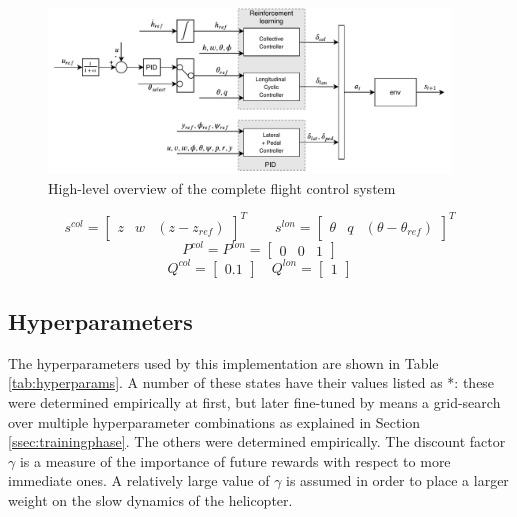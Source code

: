 \begin{figure}[ht]
    \centering
    \includegraphics[width = 0.95\textwidth]{fig/3/controldiagram.pdf}
    \caption{High-level overview of the complete flight control system}
    \label{fig:controlsystem}
\end{figure}

\begin{equation} \label{eq:state_loncol}
    s^{col} = \begin{bmatrix} z & w & (z-z_{ref}) \end{bmatrix}^T \qquad s^{lon} = \begin{bmatrix} \theta & q & (\theta-\theta_{ref}) \end{bmatrix}^T
\end{equation}
\begin{equation} \label{eq:matrices_col}
    P^{col} = P^{lon} = \begin{bmatrix} 0 & 0 & 1 \end{bmatrix}
\end{equation}
\begin{equation} \label{eq:matrices_lon}
    Q^{col} = \begin{bmatrix} 0.1 \end{bmatrix} \quad Q^{lon} = \begin{bmatrix} 1 \end{bmatrix}
\end{equation}

\subsection{Hyperparameters} \label{ssec:hyperparameters}
The hyperparameters used by this implementation are shown in Table \ref{tab:hyperparams}. A number of these states have their values listed as *: these were determined empirically at first, but later fine-tuned by means a grid-search over multiple hyperparameter combinations as explained in Section \ref{ssec:trainingphase}. The others were determined empirically. The discount factor $\gamma$ is a measure of the importance of future rewards with respect to more immediate ones. A relatively large value of $\gamma$ is assumed in order to place a larger weight on the slow dynamics of the helicopter.

